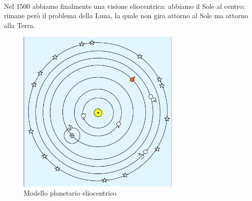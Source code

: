 \documentclass[a4paper,11pt]{article}
\begin{document}
        \\
        \newpage
        Nel 1500 abbiamo finalmente una visione eliocentrica: abbiamo il Sole al centro; rimane però il problema della Luna, la quale non gira attorno al Sole ma attorno alla Terra.
        \\
        \begin{figure}[h!!]
            \centering
                \includegraphics[width=8cm]{2dic/Modello_Eliocentrico.jpg}
                \caption{Modello planetario eliocentrico}
            \label{fig:MPE}
        \end{figure}
        \\
\end{document}
